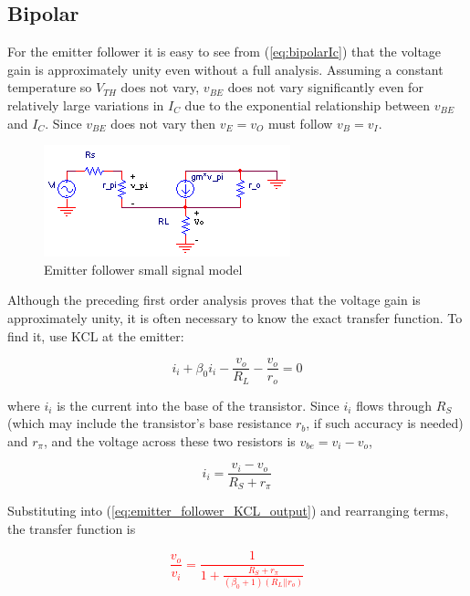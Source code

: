 \subsection{Bipolar}
For the emitter follower it is easy to see from (\ref{eq:bipolarIc}) that the voltage gain is approximately unity even without a full analysis. Assuming a constant temperature so $V_{TH}$ does not vary, $v_{BE}$ does not vary significantly even for relatively large variations in $I_{C}$ due to the exponential relationship between $v_{BE}$ and $I_{C}$. Since $v_{BE}$ does not vary then $v_{E} = v_{O}$ must follow $v_{B} = v_{I}$.
\begin{figure}[h]
	\centering
		\includegraphics{schematics/ss_emitterfollower.PNG}
	\caption{Emitter follower small signal model}
	\label{fig:ss_emitterfollower}
\end{figure}

Although the preceding first order analysis proves that the voltage gain is approximately unity, it is often necessary to know the exact transfer function. To find it, use KCL at the emitter:

\begin{equation}
i_{i}+\beta_{0} i_{i} - \frac{v_{o}}{R_{L}} - \frac{v_{o}}{r_{o}} = 0
\label{eq:emitter_follower_KCL_output}
\end{equation}

\noindent where $i_{i}$ is the current into the base of the transistor. Since $i_{i}$ flows through $R_{S}$ (which may include the transistor's base resistance $r_{b}$, if such accuracy is needed) and $r_{\pi}$, and the voltage across these two resistors is $v_{be} = v_{i} - v_{o}$, 

\begin{equation}
i_{i} = \frac{v_{i}-v_{o}}{R_{S}+r_{\pi}}
\label{eq:emitter_follower_i_i}
\end{equation}

\noindent Substituting into (\ref{eq:emitter_follower_KCL_output}) and rearranging terms, the transfer function is

\textcolor{red}{
\begin{equation}
\frac{v_{o}}{v_{i}} = \frac{1}{1+\frac{R_{S}+r_{\pi}}{(\beta_{0} + 1)(R_{L}||r_{o})}}
\label{eq:emitter_follower}
\end{equation}
}

